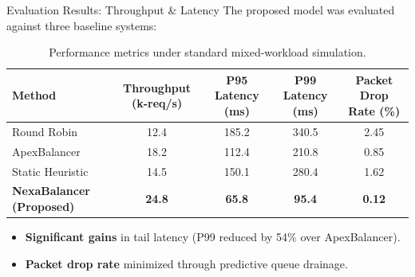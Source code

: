 \begin{frame}{Evaluation Results: Throughput \& Latency}
  The proposed model was evaluated against three baseline systems:
  
  \vspace{0.3cm}
  \begin{table}
    \centering
    \small
    \begin{tabularx}{\textwidth}{l C C C C}
      \toprule
      \textbf{Method} & \textbf{Throughput (k-req/s)} & \textbf{P95 Latency (ms)} & \textbf{P99 Latency (ms)} & \textbf{Packet Drop Rate (\%)} \\
      \midrule
      Round Robin & 12.4 & 185.2 & 340.5 & 2.45 \\
      ApexBalancer \cite{roberts2023apexbalancer} & 18.2 & 112.4 & 210.8 & 0.85 \\
      Static Heuristic & 14.5 & 150.1 & 280.4 & 1.62 \\
      \textbf{NexaBalancer (Proposed)} & \textbf{24.8} & \textbf{65.8} & \textbf{95.4} & \textbf{0.12} \\
      \bottomrule
    \end{tabularx}
    \caption{Performance metrics under standard mixed-workload simulation.}
  \end{table}
  
  \vspace{0.2cm}
  \begin{itemize}
    \item \textbf{Significant gains} in tail latency (P99 reduced by 54\% over ApexBalancer).
    \item \textbf{Packet drop rate} minimized through predictive queue drainage.
  \end{itemize}
\end{frame}
